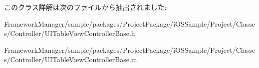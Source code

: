 このクラス詳解は次のファイルから抽出されました\+:\begin{DoxyCompactItemize}
\item 
Framework\+Manager/sample/packages/\+Project\+Package/i\+O\+S\+Sample/\+Project/\+Classes/\+Controller/U\+I\+Table\+View\+Controller\+Base.\+h\item 
Framework\+Manager/sample/packages/\+Project\+Package/i\+O\+S\+Sample/\+Project/\+Classes/\+Controller/U\+I\+Table\+View\+Controller\+Base.\+m\end{DoxyCompactItemize}
